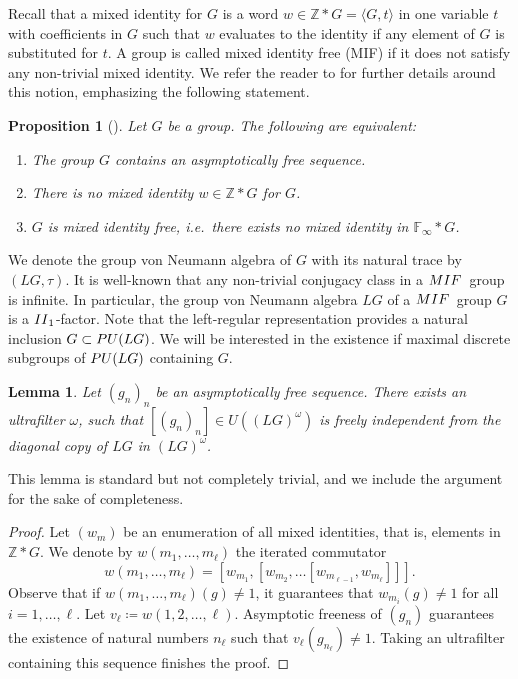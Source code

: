 \documentclass[11pt]{amsproc}
\theoremstyle{plain}
\newtheorem{lemma}[theorem]{Lemma}
\newtheorem{proposition}[theorem]{Proposition}
\theoremstyle{remark}
\begin{document}
Recall that a mixed identity for $G$ is a word $w \in \mathbb Z \ast G = \langle G, t\rangle$ in one variable $t$ with coefficients in $G$ such that $w$ evaluates to the identity if any element of $G$ is substituted for $t$. A group is called mixed identity free (MIF) if it does not satisfy any non-trivial mixed identity. We refer the reader to \cite{MR3556970} for further details around this notion, emphasizing the following statement.

\begin{proposition}[{\cite[proof of Proposition 5.3 and Remark 5.1]{MR3556970}}]
Let $G$ be a group. The following are equivalent:
\begin{enumerate}
\item The group $G$ contains an asymptotically free sequence.
\item There is no mixed identity $w \in \mathbb Z \ast G$ for $G$.
\item $G$ is mixed identity free, i.e.\ there exists no mixed identity in $\mathbb F_\infty \ast G$.
\end{enumerate}
\end{proposition}

We denote the group von Neumann algebra of $G$ with its natural trace by $(LG,\tau)$. It is well-known that any non-trivial conjugacy class in a ${\rm MIF}$~group is infinite. In particular, the group von Neumann algebra $LG$ of a ${\rm MIF}$~group $G$ is a ${\rm II}_1$-factor. Note that the left-regular representation provides a natural inclusion $G \subset {\rm PU}(LG)$.
 We will be interested in the existence if maximal discrete subgroups of ${\rm PU}(LG)$ containing $G$.

\begin{lemma}
Let $(g_n)_n$ be an asymptotically free sequence. There exists an ultrafilter $\omega$, such that $[(g_n)_n] \in U((LG)^{\omega})$ is freely independent from the diagonal copy of $LG$ in $(LG)^\omega$. 
\end{lemma}
This lemma is standard but not completely trivial, and we include the argument for the sake of completeness.
\begin{proof}
Let $(w_m)$ be an enumeration of all mixed identities, that is, elements in $\mathbb Z\ast G$. We denote by $w(m_1,\dots,m_\ell)$ the iterated commutator
\[
w(m_1,\dots,m_\ell) = [w_{m_1},[w_{m_2},\dots [w_{m_{\ell-1}},w_{m_\ell}]]].
\]
Observe that if $w(m_1,\dots,m_\ell)(g) \neq 1$, it guarantees that $w_{m_i}(g)\neq 1$ for all $i=1,\dots,\ell$. Let $v_\ell\coloneqq w(1,2,\dots,\ell)$. Asymptotic freeness of $(g_n)$ guarantees the existence of natural numbers $n_\ell$ such that $v_\ell(g_{n_\ell})\neq 1$. Taking an ultrafilter containing this sequence finishes the proof.
\end{proof}
\end{document}
